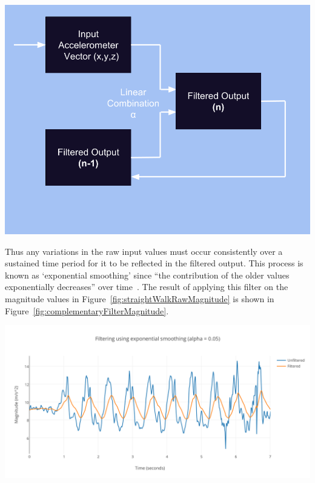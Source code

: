 \documentclass[12pt,a4paper]{report}
\begin{document}
\begin{center}
\includegraphics[scale=0.3]{images/complementaryFilter.png}
\label{fig:complementaryFilter}
\end{center}
Thus any variations in the raw input values must occur consistently over a sustained time period for it to be reflected in the filtered output. This process is known as `exponential smoothing' since ``the contribution of the older values exponentially decreases'' over time~\cite[p.2528]{casiez20121}. The result of applying this filter on the magnitude values in Figure~\ref{fig:straightWalkRawMagnitude} is shown in Figure~\ref{fig:complementaryFilterMagnitude}. 

\begin{center}
\includegraphics[scale=0.9]{images/complementaryFilterMagnitude.png}
\label{fig:complementaryFilterMagnitude}
\end{center}
\end{document}
